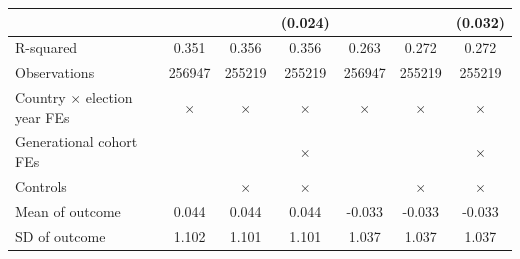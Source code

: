{\begin{tabular}{l*{6}{c}}
                    &                     &                     &     (0.024)         &                     &                     &     (0.032)         \\
\midrule
R-squared           &       0.351         &       0.356         &       0.356         &       0.263         &       0.272         &       0.272         \\
Observations        &      256947         &      255219         &      255219         &      256947         &      255219         &      255219         \\
Country $\times$ election year FEs&    $\times$         &    $\times$         &    $\times$         &    $\times$         &    $\times$         &    $\times$         \\
Generational cohort FEs&                     &                     &    $\times$         &                     &                     &    $\times$         \\
Controls            &                     &    $\times$         &    $\times$         &                     &    $\times$         &    $\times$         \\
Mean of outcome     &       0.044         &       0.044         &       0.044         &      -0.033         &      -0.033         &      -0.033         \\
SD of outcome       &       1.102         &       1.101         &       1.101         &       1.037         &       1.037         &       1.037         \\
\bottomrule
\end{tabular}
}
